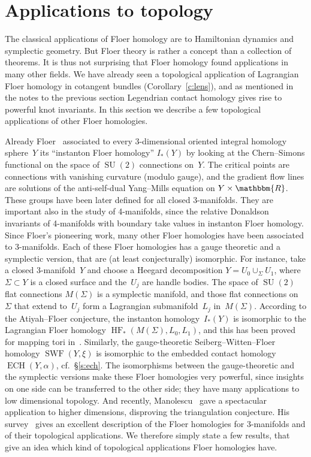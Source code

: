 \documentclass[12pt,twoside]{amsart}
\def\ECH{\operatorname{ECH}}
\def\SWF{\operatorname{SWF}}
\theoremstyle{plain}
\numberwithin{figure}{section}
\numberwithin{equation}{section}
\def\s{\smallskip}
\def\HF{\operatorname{HF}}
\def\ECH{\operatorname{ECH}}
\def\RR{\mathbbm{R}}
\def\SU{\operatorname{SU}}
\begin{document}

\section{Applications to topology} \label{s:top}

The classical applications of Floer homology are to Hamiltonian dynamics and symplectic geometry. 
But Floer theory is rather a concept than a collection of theorems.
It is thus not surprising that Floer homology found applications in many other fields. 
%
We have already seen a topological application of Lagrangian Floer homology in cotangent bundles  (Corollary~\ref{c:lens}), 
and as mentioned in the notes to the previous section 
Legendrian contact homology gives rise to powerful knot invariants. 
In this section we describe a few topological applications of other Floer homologies.

\s
Already Floer~\cite{Flo88:3man} associated to every 3-dimensional oriented integral homology sphere~$Y$
its ``instanton Floer homology'' $I_*(Y)$ by looking at the Chern--Simons functional 
on the space of $\SU (2)$ connections on~$Y$.
The critical points are connections with vanishing curvature (modulo gauge), 
and the gradient flow lines are solutions of the anti-self-dual Yang--Mills equation on $Y \times \RR$.
These groups have been later defined for all closed 3-manifolds.
They are important also in the study of 4-manifolds, since the relative Donaldson invariants
of 4-manifolds with boundary take values in instanton Floer homology.
%
Since Floer's pioneering work,
many other Floer homologies have been associated to 3-manifolds.
Each of these Floer homologies has a gauge theoretic and a symplectic version, 
that are (at least conjecturally) isomorphic. 
For instance, take a closed 3-manifold~$Y$ and choose a Heegard decomposition $Y = U_0 \cup_{\Sigma} U_1$,
where $\Sigma \subset Y$ is a closed surface and the~$U_j$ are handle bodies. 
The space of $\SU (2)$ flat connections $M(\Sigma)$ is a symplectic manifold, and those flat connections
on~$\Sigma$ that extend to~$U_j$ form a Lagrangian submanifold~$L_j$ in~$M(\Sigma)$.
According to the Atiyah--Floer conjecture, the instanton homology~$I_*(Y)$ 
is isomorphic to the Lagrangian Floer homology $\HF_*(M(\Sigma),L_0,L_1)$, 
and this has been proved for mapping tori in~\cite{DoSa94}.
%
Similarly, the gauge-theoretic Seiberg--Witten--Floer homology $\SWF (Y,\xi)$ is isomorphic to the embedded contact homology 
$\ECH (Y,\alpha)$, cf.\ \S \ref{s:ech}.
The isomorphisms between the gauge-theoretic and the symplectic versions make these Floer homologies 
very powerful, since insights on one side can be transferred to the other side; 
they have many applications to low dimensional topology.
%
And recently, Manolescu~\cite{Ma16} gave a spectacular application to higher dimensions, 
disproving the triangulation conjecture.
His survey~\cite{Ma15} gives an excellent description of the Floer homologies for 3-manifolds
and of their topological applications.
We therefore simply state a few  results, 
that give an idea which kind of topological applications Floer homologies have.
\end{document}
